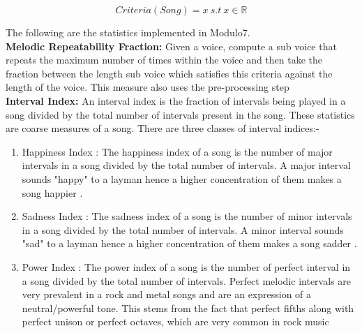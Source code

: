 \begin{equation}
Criteria(Song) = x \ s.t \ x \in \mathbb{R}
\end{equation}

\noindent The following are the statistics implemented in Modulo7. \\

\noindent \textbf{Melodic Repeatability Fraction: } Given a voice, compute a sub voice that repeats the maximum number of times within the voice and then take the fraction between the length sub voice which satisfies this criteria against the length of the voice. This measure also uses the pre-processing step \\

\noindent \textbf{Interval Index: } \label{intervals} An interval index is the fraction of intervals being played in a song divided by the total number of intervals present in the song. These statistics are coarse measures of a song. There are three classes of interval indices:-

\begin{enumerate}
\item Happiness Index : The happiness index of a song is the number of major intervals in a song divided by the total number of intervals. A major interval sounds "happy" to a layman hence a higher concentration of them makes a song happier \cite{majorvsminorintervals}. 
\item Sadness Index : The sadness index of a song is the number of minor intervals \cite{minorintervalssad}  in a song divided by the total number of intervals. A minor interval sounds "sad" to a layman hence a higher concentration of them makes a song sadder \cite{majorvsminorintervals}. 
\item Power Index : The power index of a song is the number of perfect interval in a song divided by the total number of intervals. Perfect melodic intervals are very prevalent in a rock and metal songs and are an expression of a neutral/powerful tone. This stems from the fact that perfect fifths along with perfect unison or perfect octaves, which are very common in rock music \cite{foundationsOfRock} 
\end{enumerate}